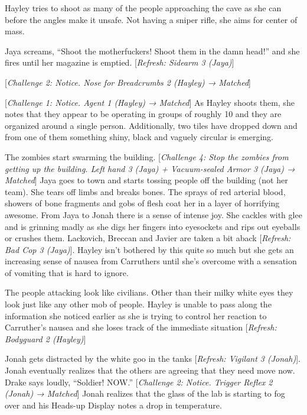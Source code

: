 
Hayley tries to shoot as many of the people approaching the cave as she can before the angles make it unsafe.  Not having a sniper rifle, she aims for center of mass.

Jaya screams, ``Shoot the motherfuckers!  Shoot them in the damn head!'' and she fires until her magazine is emptied.  {[}\textit{Refresh: Sidearm 3 (Jaya)}{]}

{[}\textit{Challenge 2: Notice.  Nose for Breadcrumbs 2 (Hayley) → Matched}{]}

{[}\textit{Challenge 1: Notice. Agent 1 (Hayley) → Matched}{]}  As Hayley shoots them, she notes that they appear to be operating in groups of roughly 10 and they are organized around a single person.  Additionally, two tiles have dropped down and from one of them something shiny, black and vaguely circular is emerging.

The zombies start swarming the building.  {[}\textit{Challenge 4: Stop the zombies from getting up the building.  Left hand 3 (Jaya) + Vacuum-sealed Armor 3 (Jaya) → Matched}{]}  Jaya goes to town and starts tossing people off the building (not her team).  She tears off limbs and breaks bones.  The sprays of red arterial blood, showers of bone fragments and gobs of flesh coat her in a layer of horrifying awesome.  From Jaya to Jonah there is a sense of intense joy.  She cackles with glee and is grinning madly as she digs her fingers into eyesockets and rips out eyeballs or crushes them.  Lackovich, Breccan and Javier are taken a bit aback {[}\textit{Refresh: Bad Cop 3 (Jaya)}{]}.  Hayley isn't bothered by this quite so much but she gets an increasing sense of nausea from Carruthers until she's overcome with a sensation of vomiting that is hard to ignore.



The people attacking look like civilians.  Other than their milky white eyes they look just like any other mob of people.  Hayley is unable to pass along the information she noticed earlier as she is trying to control her reaction to Carruther's nausea and she loses track of the immediate situation {[}\textit{Refresh: Bodyguard 2 (Hayley)}{]}





Jonah gets distracted by the white goo in the tanks {[}\textit{Refresh: Vigilant 3 (Jonah)}{]}.  Jonah eventually realizes that the others are agreeing that they need move now.  Drake says loudly, ``Soldier!  NOW.''  {[}\textit{Challenge 2: Notice. Trigger Reflex 2 (Jonah) → Matched}{]}  Jonah realizes that the glass of the lab is starting to fog over and his Heads-up Display notes a drop in temperature.

